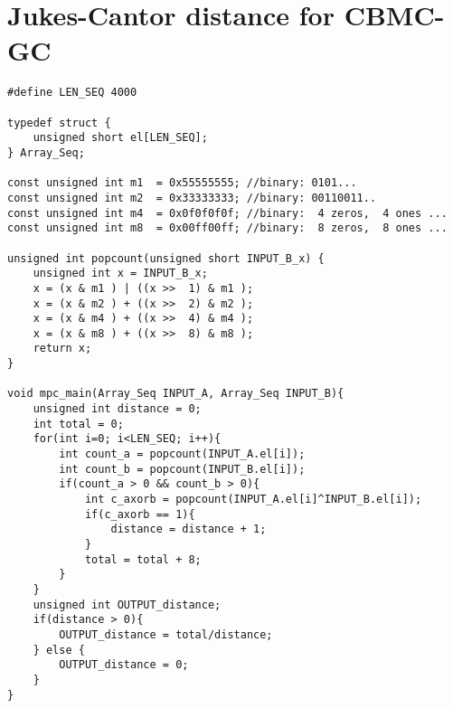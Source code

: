 
\appendix

\chapter{Jukes-Cantor distance for CBMC-GC}\label{appendix:appendixA}

%


\begin{lstlisting}
#define LEN_SEQ 4000

typedef struct {
	unsigned short el[LEN_SEQ];
} Array_Seq;

const unsigned int m1  = 0x55555555; //binary: 0101...
const unsigned int m2  = 0x33333333; //binary: 00110011..
const unsigned int m4  = 0x0f0f0f0f; //binary:  4 zeros,  4 ones ...
const unsigned int m8  = 0x00ff00ff; //binary:  8 zeros,  8 ones ...

unsigned int popcount(unsigned short INPUT_B_x) {
    unsigned int x = INPUT_B_x;
    x = (x & m1 ) | ((x >>  1) & m1 ); 
    x = (x & m2 ) + ((x >>  2) & m2 );
    x = (x & m4 ) + ((x >>  4) & m4 ); 
    x = (x & m8 ) + ((x >>  8) & m8 );
    return x;
}

void mpc_main(Array_Seq INPUT_A, Array_Seq INPUT_B){
	unsigned int distance = 0;
	int total = 0;
	for(int i=0; i<LEN_SEQ; i++){		
		int count_a = popcount(INPUT_A.el[i]);
		int count_b = popcount(INPUT_B.el[i]);
		if(count_a > 0 && count_b > 0){
			int c_axorb = popcount(INPUT_A.el[i]^INPUT_B.el[i]);			
			if(c_axorb == 1){
				distance = distance + 1;
			}
			total = total + 8;
		}
	}
	unsigned int OUTPUT_distance;
	if(distance > 0){
		OUTPUT_distance = total/distance;
	} else {
		OUTPUT_distance = 0;
	}
}
\end{lstlisting}
 

%
%
%
%
%
%
%